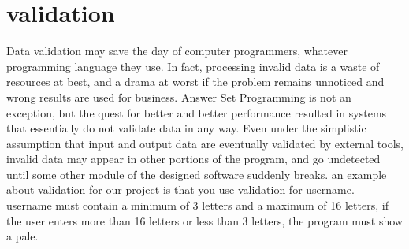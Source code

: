 \section {validation  }\label{sec:validation }
Data validation may save the day of computer programmers, whatever programming language they use. 
In fact, processing invalid data is a waste of resources at best, and a drama at worst if the problem 
remains unnoticed and wrong results are used for business. Answer Set Programming is not an exception,
but the quest for better and better performance resulted in systems that essentially do not validate
data in any way. Even under the simplistic assumption that input and output data are eventually
validated by external tools, invalid data may appear in other portions of the program, and go
undetected until some other module of the designed software suddenly breaks.
an example about validation for our project is 
that you use validation for username. 
username must contain a minimum of 3 letters and a maximum of 16 letters, if the user enters more
than 16 letters or less than 3 letters, the program must show a pale.



